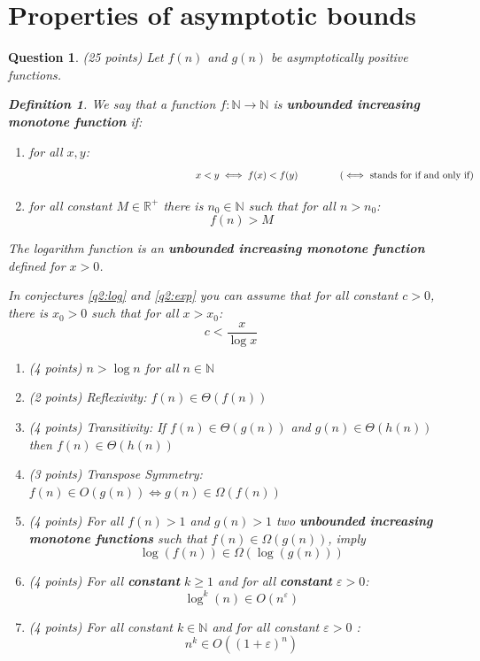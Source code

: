 \documentclass[a4paper]{article}
\theoremstyle{remarksStyle}
\newtheorem*{definition}{Definition}
\theoremstyle{questionStyle}
\newtheorem{question}{Question}
\theoremstyle{answerStyle}
\begin{document}
\section {Properties of asymptotic bounds}
\begin{question} (25 points) \label{q2}
Let $f(n)$ and $g(n)$ be asymptotically positive functions.

\begin{definition}
    We say that a function $f: \mathbb{N} \to \mathbb{N}$ is \textbf{unbounded increasing monotone function} if:
    \begin{enumerate}
        \item for all $x,y$:
        \[\text{\hspace{6cm}}x < y \iff f(x) < f(y) \text{\hspace{1.4cm} ($\iff$ stands for if and only if)}\]

        
        \item for all constant $M\in \mathbb{R}^+$ there is $n_0 \in \mathbb{N}$ such that for all $n > n_0$:
        \[f(n) > M\]
    \end{enumerate}
\end{definition}

\begin{boxxed}
    \textcolor{CB_blue}{
    The logarithm function is an \textbf{unbounded increasing monotone function} defined for $x > 0$.}
\end{boxxed}

\begin{boxxed}
    \textcolor{CB_blue}{
    In conjectures \ref{q2:log} and \ref{q2:exp} you can assume that for all constant $c > 0$, there is $x_0 > 0$ such that for all $x > x_0$: \[c < \frac{x}{\log x}\]}
\end{boxxed}

\vspace{1ex}
\begin{enumerate}
    \item (4 points) $n > \log n $ for all $n \in \mathbb{N}$
    \item (2 points) Reflexivity: $f(n) \in \Theta(f(n))$
    \item (4 points) Transitivity: If $f(n) \in \Theta(g(n))$ and $g(n) \in \Theta(h(n))$ then $f(n) \in \Theta(h(n))$
    \item (3 points) Transpose Symmetry: $f(n) \in O(g(n)) \iff g(n) \in \Omega(f(n))$
    \item (4 points) For all $f(n) > 1$ and $g(n) > 1$ two \textbf{\textcolor{Bittersweet}{unbounded increasing monotone functions}} such that $f(n) \in \Omega(g(n))$, imply \[\log (f(n)) \in \Omega(\log (g(n)))\]

    \item (4 points) \label{q2:log} For all \textbf{constant} $k \ge 1$ and for all \textbf{constant} $\varepsilon > 0$:
    \[ \log^k (n) \in O (n^\varepsilon) \]
    \item (4 points) \label{q2:exp} For all constant $k \in \mathbb{N}$ and for all constant $\varepsilon > 0$ :
    \[n^k \in O( (1 + \varepsilon)^n)\]
\end{enumerate}
\end{question}
\end{document}
